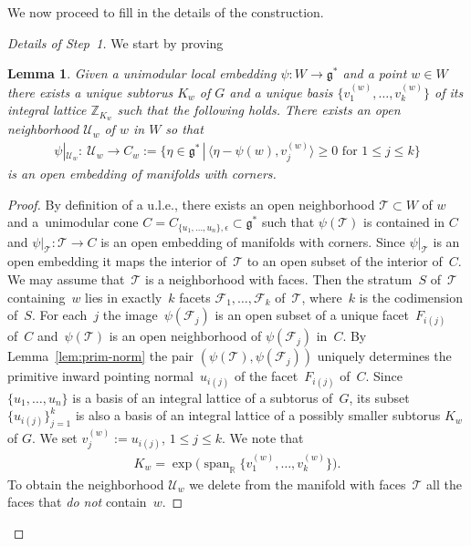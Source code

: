 \documentclass[10pt,a4paper]{amsart}
\numberwithin{equation}{section}
\newtheorem{Lemma}{Lemma}[section]
\begin{document}
We now proceed to f\/ill in the details of the construction.
\begin{proof}[Details of Step~1] We start by proving

\begin{Lemma} \label{lemma:step1.1} Given a unimodular local embedding
  $\psi\colon W\to {\mathfrak g}^*$ and a point $w \in W$ there exists a unique subtorus $K_w$
  of $G$ and a unique basis $\{v_1^{(w)},\ldots, v_k^{(w)}\}$ of its integral
  lattice ${\mathbb Z}_{K_w}$ such that the following holds.
There exists an open neighborhood ${\mathcal U}_w$ of $w$ in $W$ so that
\begin{gather*}
\psi|_{{\mathcal U}_w}\colon \ {\mathcal U}_w \to C_w:= \big\{
\eta \in {\mathfrak g}^* \,|\,
\big\langle \eta -\psi (w),  v_j^{(w)}\big\rangle\geq 0 \text{ for } 1\leq j\leq k\big\}
\end{gather*}
is an open embedding of manifolds with corners.
\end{Lemma}

\begin{proof}
By def\/inition of a u.l.e., there exists an open neighborhood ${\mathcal T}
\subset W$ of $w$ and a~uni\-mo\-du\-lar cone $C = C_{\{u_1,\ldots,u_n\},
  \epsilon} \subset {\mathfrak g}^*$ such that $\psi({\mathcal T})$ is contained in $C$ and
$\psi|_{{\mathcal T}} \colon {\mathcal T} \to C$ is an open embedding of manifolds
with corners.  Since $\psi|_{{\mathcal T}}$ is an open embedding it maps the
interior of~${\mathcal T}$ to an open subset of the interior of~$C$.  We may
assume that~${\mathcal T}$ is a neighborhood with faces.  Then the stratum~$S$ of~${\mathcal T}$ containing~$w$ lies in exactly~$k$
facets ${\mathcal F}_1,\ldots, {\mathcal F}_k$ of~${\mathcal T}$, where~$k$ is the
codimension of~$S$.  For each~$j$ the image~$\psi({\mathcal F}_j)$ is an
open subset of a unique facet~$F_{i(j)}$ of~$C$ and~$\psi({\mathcal T})$ is
an open neighborhood of $\psi({\mathcal F}_j)$ in~$C$.
By Lemma~\ref{lem:prim-norm} the pair $(\psi({\mathcal T}), \psi({\mathcal F}_j))$ uniquely
determines the primitive inward pointing normal~$u_{i(j)}$ of the facet~$F_{i(j)}$ of~$C$.  Since $\{u_1,\ldots,u_n\}$ is a basis of an integral
lattice of a subtorus of~$G$, its subset $\{u_{i(j)}\}_{j=1}^k$ is
also a basis of an integral lattice of a possibly smaller subtorus
$K_w$ of $G$. We set $v_j^{(w)}:= u_{i(j)} $, $1\leq j\leq k$.
We  note that
\begin{gather*}
K_w = \exp\big(\operatorname{span}_{\mathbb R} \big\{v_1^{(w)},\ldots, v_k^{(w)}\big\}\big).
\end{gather*}
To obtain the neighborhood ${\mathcal U}_w$ we delete from the manifold with
faces~${\mathcal T}$ all the faces that {\em do not} contain~$w$.
\end{proof}


\end{proof}
\end{document}
